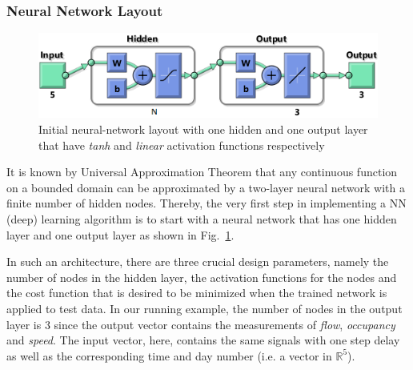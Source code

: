 \documentclass[twocolumn,10pt]{asme2e}
\begin{document}
\subsubsection{Neural Network Layout}

\begin{figure}[t]
	\centering
	\includegraphics[width=1\linewidth]{./Figures/NN_1}
	\caption{Initial neural-network layout with one hidden and one output layer that have \emph{tanh} and \emph{linear} activation functions respectively }
	\label{fig:nn1}
\end{figure} 

It is known by Universal Approximation Theorem  \cite{universality} that any continuous function on a bounded domain can be approximated by a two-layer neural network with a finite number of hidden nodes. Thereby, the very first step in implementing a NN (deep) learning algorithm is to start with a neural network that has one hidden layer and one output layer as shown in Fig.~\ref{fig:nn1}. 

In such an architecture, there are three crucial design parameters, namely the number of nodes in the hidden layer, the activation functions for the nodes and the cost function that is desired to be minimized when the trained network is applied to test data. In our running example, the number of nodes in the output layer is 3 since the output vector contains the measurements of \emph{flow}, \emph{occupancy} and \emph{speed}. The input vector, here, contains the same signals with one step delay as well as the corresponding time and day number (i.e. a vector in $\mathbb{R}^5$). 
\end{document}
